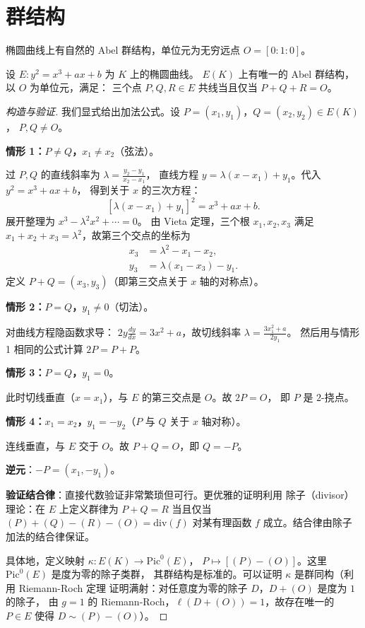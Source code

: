 \section{群结构}
\label{sec:group-law}

椭圆曲线上有自然的 Abel 群结构，单位元为无穷远点 $O = [0:1:0]$。

\begin{theorem}[椭圆曲线的群律]
\label{thm:group-law}
设 $E\colon y^2 = x^3 + ax + b$ 为 $K$ 上的椭圆曲线。
$E(K)$ 上有唯一的 Abel 群结构，以 $O$ 为单位元，满足：
三个点 $P, Q, R \in E$ 共线当且仅当 $P + Q + R = O$。
\end{theorem}

\begin{proof}[构造与验证]
我们显式给出加法公式。设 $P = (x_1, y_1)$，$Q = (x_2, y_2) \in E(K)$，
$P, Q \neq O$。

\textbf{情形 1：$P \neq Q$，$x_1 \neq x_2$}（弦法）。

过 $P, Q$ 的直线斜率为 $\lambda = \frac{y_2 - y_1}{x_2 - x_1}$，
直线方程 $y = \lambda(x - x_1) + y_1$。代入 $y^2 = x^3 + ax + b$，
得到关于 $x$ 的三次方程：
\[
  [\lambda(x - x_1) + y_1]^2 = x^3 + ax + b.
\]
展开整理为 $x^3 - \lambda^2 x^2 + \cdots = 0$。
由 Vieta 定理，三个根 $x_1, x_2, x_3$ 满足
$x_1 + x_2 + x_3 = \lambda^2$，故第三个交点的坐标为
\begin{align}
  x_3 &= \lambda^2 - x_1 - x_2, \\
  y_3 &= \lambda(x_1 - x_3) - y_1.
\end{align}
定义 $P + Q = (x_3, y_3)$（即第三交点关于 $x$ 轴的对称点）。

\textbf{情形 2：$P = Q$，$y_1 \neq 0$}（切法）。

对曲线方程隐函数求导：
$2y\frac{dy}{dx} = 3x^2 + a$，故切线斜率
$\lambda = \frac{3x_1^2 + a}{2y_1}$。
然后用与情形 1 相同的公式计算 $2P = P + P$。

\textbf{情形 3：$P = Q$，$y_1 = 0$}。

此时切线垂直（$x = x_1$），与 $E$ 的第三交点是 $O$。故 $2P = O$，
即 $P$ 是 $2$-挠点。

\textbf{情形 4：$x_1 = x_2$，$y_1 = -y_2$}（$P$ 与 $Q$ 关于 $x$ 轴对称）。

连线垂直，与 $E$ 交于 $O$。故 $P + Q = O$，即 $Q = -P$。

\textbf{逆元}：$-P = (x_1, -y_1)$。

\textbf{验证结合律}：直接代数验证非常繁琐但可行。更优雅的证明利用
除子（divisor）理论：在 $E$ 上定义群律为
$P + Q = R$ 当且仅当 $(P) + (Q) - (R) - (O) = \mathrm{div}(f)$
对某有理函数 $f$ 成立。结合律由除子加法的结合律保证。

具体地，定义映射 $\kappa\colon E(K) \to \mathrm{Pic}^0(E)$，
$P \mapsto [(P) - (O)]$。这里 $\mathrm{Pic}^0(E)$ 是度为零的除子类群，
其群结构是标准的。可以证明 $\kappa$ 是群同构（利用 Riemann-Roch 定理
证明满射：对任意度为零的除子 $D$，$D + (O)$ 是度为 $1$ 的除子，
由 $g = 1$ 的 Riemann-Roch，$\ell(D + (O)) = 1$，故存在唯一的
$P \in E$ 使得 $D \sim (P) - (O)$）。
\end{proof}

